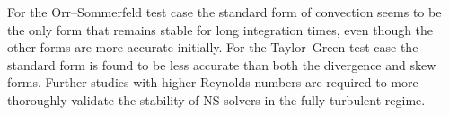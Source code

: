 For the Orr--Sommerfeld test case the standard form of convection seems
to be the only form that remains stable for long integration times, even
though the other forms are more accurate initially. For the Taylor--Green
test-case the standard form is found to be less accurate than both the
divergence and skew forms. Further studies with higher Reynolds numbers
are required to more thoroughly validate the stability of NS solvers in
the fully turbulent regime.
